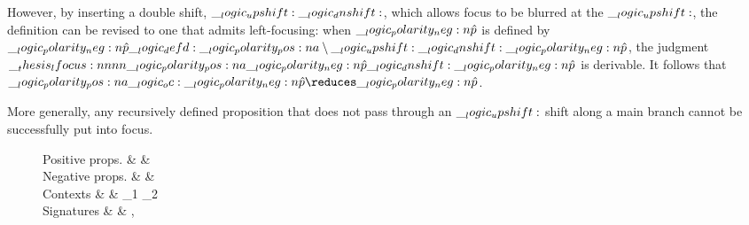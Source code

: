 However, by inserting a double shift, $\__logic_upshift: \__logic_dnshift:$, which allows focus to be blurred at the $\__logic_upshift:$, the definition can be revised to one that admits left-focusing: when $\__logic_polarity_neg:n {\hat{p}}$ is defined by $\__logic_polarity_neg:n {\hat{p}} \__logic_defd: \__logic_polarity_pos:n {a} \mathbin { \setminus } \__logic_upshift: \__logic_dnshift: \__logic_polarity_neg:n {\hat{p}}$, the judgment $\__thesis_lfocus:nnnn {\__logic_polarity_pos:n {a}} {\__logic_polarity_neg:n {\hat{p}}} {} {\__logic_dnshift: \__logic_polarity_neg:n {\hat{p}}}$ is derivable.
It follows that $\p{a} \oc \n{\defp{p}} \reduces \n{\defp{p}}$.

More generally, any recursively defined proposition that does not pass through an $\__logic_upshift:$ shift along a main branch cannot be successfully put into focus.




\begin{figure}
  \vspace*{\dimexpr-\abovedisplayskip-\abovecaptionskip\relax}
  \begin{syntax*}
    Positive props. &
       &  \fuse {} \mid \one \mid {} \mid \dn {}
    \\
    Negative props. &
       &  \limp {} \mid {} \pmir {} \mid {} \with {} \mid \top \mid {} \mid \up {}
    \\
    Contexts &
      \np{\octx} & \np{\octx}_1 \oc \np{\octx}_2 \mid \octxe \mid {} \mid {}
    \\
    Signatures &
      \orsig & \orsige \mid \orsig,   {}
  \end{syntax*}
\end{figure}
